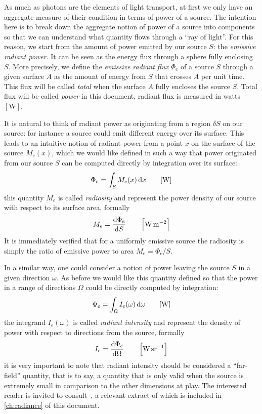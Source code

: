 As much as photons are the elements of light transport, at first we only have an
aggregate measure of their condition in terms of power of a source.
The intention here is to break down the aggregate notion of power of a source
into components so that we can understand what quantity flows through a ``ray of
light''.
For this reason, we start from the amount of power emitted by our source $S$:
the \textsl{emissive radiant power}.
It can be seen as the energy flux through a sphere fully enclosing $S$.
More precisely, we define the \textsl{emissive radiant flux} $\Phi_e$ of a
source $S$ through a given surface $A$ as the amount of energy from $S$ that
crosses $A$ per unit time. This flux will be called \textsl{total} when the surface
$A$ fully encloses the source $S$. Total flux will be called \textsl{power} in
this
document, radiant flux is measured in watts $[\unit{\watt}]$.

It is natural to think of radiant power as originating from a region $\delta S$ on our source:
for instance a source could emit different energy over its surface. This leads to an
intuitive notion of radiant power from a point $x$ on the surface of the source
$M_e(x)$, which
we would like defined in such a way that power originated from our source $S$
can be computed
directly by integration over its surface:
\begin{displaymath}
\Phi_e = \int_{S} M_e(x) \d x \qquad [\unit{\watt}]
\end{displaymath}
this quantity $M_e$ is called \textsl{radiosity} and represent the power density
of our
source with respect to its surface area, formally
\begin{displaymath}
M_e = \frac{\d\Phi_e}{\d S} \qquad \left[\unit{\watt\per\square\meter}\right]
\end{displaymath}
It is immediately verified that for a uniformly emissive source the
radiosity is simply the ratio of emissive power to area
$M_e = \Phi_e / S$.

In a similar way, one could consider a notion of power leaving the source $S$ in
a given
direction $\omega$.
As before we would like this quantity defined so that the power in a range of
directions
$\Omega$ could be directly computed by integration:
\begin{displaymath}
\Phi_e = \int_\Omega I_e(\omega) \d\omega \qquad [\unit{\watt}]
\end{displaymath}
the integrand $I_e(\omega)$ is called \textsl{radiant intensity} and represent
the density
of power with respect to directions from the source, formally
\begin{displaymath}
I_e = \frac{\d\Phi_e}{\d\Omega} \qquad \left[\unit{\watt\per\steradian}\right]
\end{displaymath}
it is very important to note that radiant intensity should be considered a
``far-field'' quantity, that is to say, a quantity that is only valid when
the source is extremely small in comparison to the other dimensions at play.
The interested reader is invited to consult~\cite{nicodemus63}, a relevant
extract of which is included in \cref{ch:radiance} of this document.

